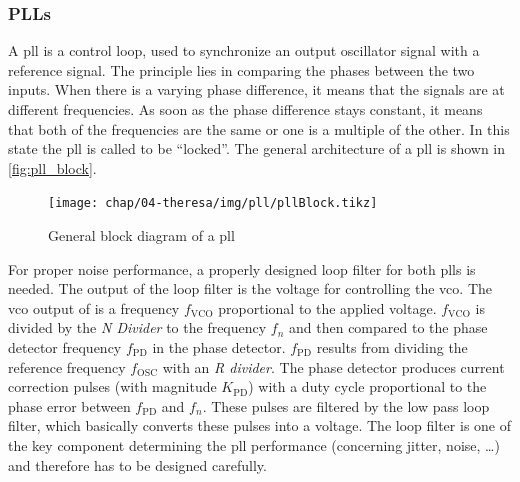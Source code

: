 \subsubsection*{PLLs}
A \gls{pll} is a control loop, used to synchronize an output oscillator signal with a reference signal.
The principle lies in comparing the phases between the two inputs. 
When there is a varying phase difference, it means that the signals are at different frequencies.
As soon as the phase difference stays constant, it means that both of the frequencies are the same or one is a multiple of the other. 
In this state the \gls{pll} is called to be ``locked''.
The general architecture of a \gls{pll} is shown in \autoref{fig:pll_block}.
\begin{figure}[H]
	\centering
	\texttt{[image: chap/04-theresa/img/pll/pllBlock.tikz]}
	\caption[PLL block diagram]{General block diagram of a \gls{pll} \cite{pll_design}}
	\label{fig:pll_block}
\end{figure}
For proper noise performance, a properly designed loop filter for both \glspl{pll} is needed. 
The output of the loop filter is the voltage for controlling the \gls{vco}.
The \gls{vco} output of is a frequency $f_\text{VCO}$ proportional to the applied voltage.
$f_\text{VCO}$ is divided by the \textit{N Divider} to the frequency $f_n$ and then compared to the phase detector frequency $f_\text{PD}$ in the phase detector. 
$f_\text{PD}$ results from dividing the reference frequency $f_\text{OSC}$ with an \textit{R divider}. 
The phase detector produces current correction pulses (with magnitude $K_\text{PD}$) with a duty cycle proportional to the phase error between $f_\text{PD}$ and $f_n$. 
These pulses are filtered by the low pass loop filter, which basically converts these pulses into a voltage. \cite{pll_design}
The loop filter is one of the key component determining the \gls{pll} performance (concerning jitter, noise, \ldots) and therefore has to be designed carefully.


